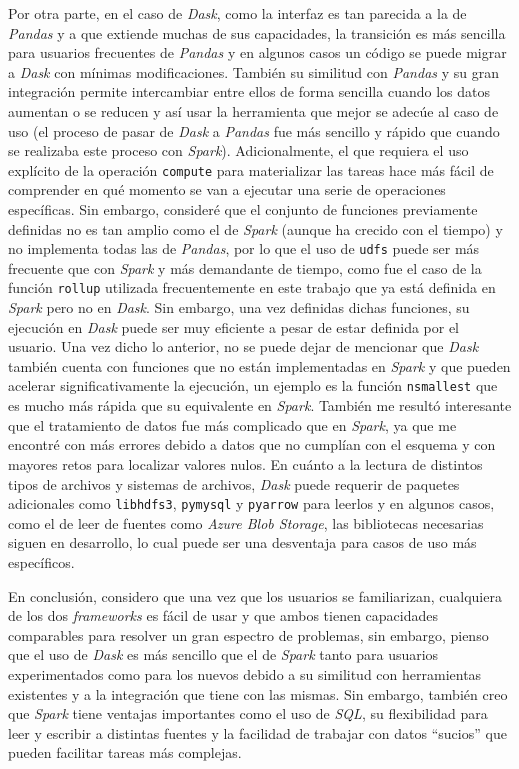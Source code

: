 Por otra parte, en el caso de \textit{Dask}, como la interfaz es tan parecida a la de \textit{Pandas} y a que extiende muchas de sus capacidades, la transición es más sencilla para usuarios frecuentes de \textit{Pandas} y en algunos casos un código se puede migrar a \textit{Dask} con mínimas modificaciones. También su similitud con \textit{Pandas} y su gran integración permite intercambiar entre ellos de forma sencilla cuando los datos aumentan o se reducen y así usar la herramienta que mejor se adecúe al caso de uso (el proceso de pasar de \textit{Dask} a \textit{Pandas} fue más sencillo y rápido que cuando se realizaba este proceso con \textit{Spark}). Adicionalmente, el que requiera el uso explícito de la operación \texttt{compute} para materializar las tareas hace más fácil de comprender en qué momento se van a ejecutar una serie de operaciones específicas. Sin embargo, consideré que el conjunto de funciones previamente definidas no es tan amplio como el de \textit{Spark} (aunque ha crecido con el tiempo) y no implementa todas las de \textit{Pandas}, por lo que el uso de \texttt{udfs} puede ser más frecuente que con \textit{Spark} y más demandante de tiempo, como fue el caso de la función \texttt{rollup} utilizada frecuentemente en este trabajo que ya está definida en \textit{Spark} pero no en \textit{Dask}. Sin embargo, una vez definidas dichas funciones, su ejecución en \textit{Dask} puede ser muy eficiente a pesar de estar definida por el usuario. Una vez dicho lo anterior, no se puede dejar de mencionar que \textit{Dask} también cuenta con funciones que no están implementadas en \textit{Spark} y que pueden acelerar significativamente la ejecución, un ejemplo es la función \texttt{nsmallest} que es mucho más rápida que su equivalente en \textit{Spark}. También me resultó interesante que el tratamiento de datos fue más complicado que en \textit{Spark}, ya que me encontré con más errores debido a datos que no cumplían con el esquema y con mayores retos para localizar valores nulos. En cuánto a la lectura de distintos tipos de archivos y sistemas de archivos, \textit{Dask} puede requerir de paquetes adicionales como \texttt{libhdfs3}, \texttt{pymysql} y \texttt{pyarrow} para leerlos y en algunos casos, como el de leer de fuentes como \textit{Azure Blob Storage}, las bibliotecas necesarias siguen en desarrollo, lo cual puede ser una desventaja para casos de uso más específicos.

En conclusión, considero que una vez que los usuarios se familiarizan, cualquiera de los dos \textit{frameworks} es fácil de usar y que ambos tienen capacidades comparables para resolver un gran espectro de problemas, sin embargo, pienso que el uso de \textit{Dask} es más sencillo que el de \textit{Spark} tanto para usuarios experimentados como para los nuevos debido a su similitud con herramientas existentes y a la integración que tiene con las mismas. Sin embargo, también creo que \textit{Spark} tiene ventajas importantes como el uso de \textit{SQL}, su flexibilidad para leer y escribir a distintas fuentes y la facilidad de trabajar con datos ``sucios'' que pueden facilitar tareas más complejas.

